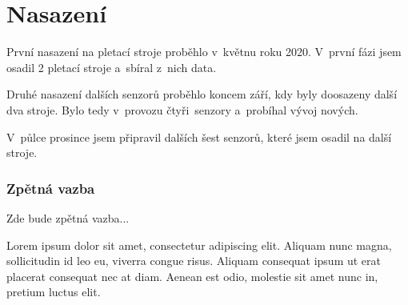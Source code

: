\chapter{Nasazení}
První nasazení na pletací stroje proběhlo v~květnu roku 2020.
V~první fázi jsem osadil 2 pletací stroje a~sbíral z~nich data.

Druhé nasazení dalších senzorů proběhlo koncem září, kdy byly doosazeny další dva stroje.
Bylo tedy v~provozu čtyři~senzory a~probíhal vývoj nových.

V~půlce prosince jsem připravil dalších šest senzorů, které jsem osadil na další stroje.


\subsection{Zpětná vazba}
Zde bude zpětná vazba...

Lorem ipsum dolor sit amet, consectetur adipiscing elit.
Aliquam nunc magna, sollicitudin id leo eu, viverra congue risus.
Aliquam consequat ipsum ut erat placerat consequat nec at diam. 
Aenean est odio, molestie sit amet nunc in, pretium luctus elit. 




\newpage